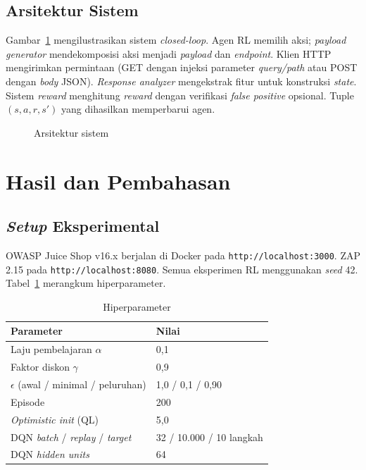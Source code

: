 \documentclass[a4paper,12pt]{article}
\begin{document}
\subsection{Arsitektur Sistem}

Gambar~\ref{fig:architecture} mengilustrasikan sistem \textit{closed-loop}. Agen RL memilih aksi; \textit{payload generator} mendekomposisi aksi menjadi \textit{payload} dan \textit{endpoint}. Klien HTTP mengirimkan permintaan (GET dengan injeksi parameter \textit{query/path} atau POST dengan \textit{body} JSON). \textit{Response analyzer} mengekstrak fitur untuk konstruksi \textit{state}. Sistem \textit{reward} menghitung \textit{reward} dengan verifikasi \textit{false positive} opsional. Tuple $(s,a,r,s')$ yang dihasilkan memperbarui agen.

\begin{figure}[H]
\centering
{}
\caption{Arsitektur sistem}
\label{fig:architecture}
\end{figure}

\section{Hasil dan Pembahasan}

\subsection{\textit{Setup} Eksperimental}

OWASP Juice Shop v16.x berjalan di Docker pada \texttt{http://localhost:3000}. ZAP 2.15 pada \texttt{http://localhost:8080}. Semua eksperimen RL menggunakan \textit{seed} 42. Tabel~\ref{tab:hyperparams} merangkum hiperparameter.

\begin{table}[H]
\caption{Hiperparameter}
\centering
\label{tab:hyperparams}
\small
\begin{tabular}{ll}
\toprule
Parameter & Nilai \\
\midrule
Laju pembelajaran $\alpha$ & 0,1 \\
Faktor diskon $\gamma$ & 0,9 \\
$\epsilon$ (awal / minimal / peluruhan) & 1,0 / 0,1 / 0,90 \\
Episode & 200 \\
\textit{Optimistic init} (QL) & 5,0 \\
DQN \textit{batch} / \textit{replay} / \textit{target} & 32 / 10.000 / 10 langkah \\
DQN \textit{hidden units} & 64 \\
\bottomrule
\end{tabular}
\end{table}
\end{document}
